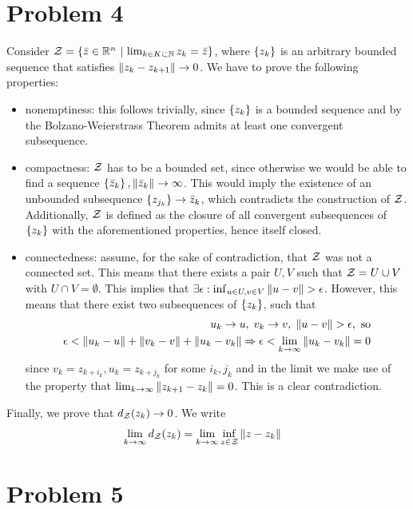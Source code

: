 \documentclass[10pt]{article}
\begin{document}
\section*{Problem 4}
Consider $\mathcal{Z} = \left\{ \bar{z} \in \mathbb{R}^n \ \middle| \  \lim_{k \in K \subset \mathbb{N}} z_{k}
= \bar{z} \right\}$, where $\left\{ z_k \right\}$ is an arbitrary bounded sequence that satisfies
$\left \| z_k - z_{k+1} \right \| \to 0$. We have to prove the following properties:
\begin{itemize}
\item nonemptiness: this follows trivially, since $\left\{ z_k \right\}$ is a bounded
sequence and by the Bolzano-Weierstrass Theorem admits at least one convergent
subsequence.
\item compactness: $\mathcal{Z}$ has to be a bounded set, since otherwise we would be
able to find a sequence $\left\{ \bar{z}_k \right\}, \left \| \bar{z}_k \right \| \to \infty$. This
would imply the existence of an unbounded subsequence $\left\{ z_{j_k} \right\} \to
\bar{z}_k$, which contradicts the construction of $\mathcal{Z}$.
Additionally, $\mathcal{Z}$ is defined as the closure of all convergent subsequences of
$\left\{ z_k \right\}$ with the aforementioned properties, hence itself closed.
\item connectedness: assume, for the sake of contradiction, that $\mathcal{Z}$ was not
a connected set. This means that there exists a pair $U, V$ such
that $\mathcal{Z} = U \cup V$ with $U \cap V = \emptyset$. This implies that
$\exists \epsilon: \inf_{u \in U, v \in V} \left \| u - v \right \| > \epsilon$. However,
this means that there exist two subsequences of $\left\{ z_k \right\}$, such that
\begin{align*}
    u_{k} \to u, \; v_{k} \to v, \; \left \| u - v \right \| > \epsilon, \text{ so} \\
    \epsilon < \left \| u_k - u \right \| + \left \| v_k - v \right \| + \left \| u_k - v_k \right \| \Rightarrow
    \epsilon < \lim_{k \to \infty} \left \| u_k - v_k \right \| = 0
\end{align*}
since $v_k = z_{k + i_k}, u_k = z_{k + j_k}$ for some $i_k, j_k$ and in the
limit we make use of the property that $\lim_{k \to \infty} \left \| z_{k+1} -
z_k \right \| = 0$. This is a clear contradiction.

\end{itemize}
Finally, we prove that $d_{\mathcal{Z}}(z_k) \to 0$. We write
\begin{align*}
    \lim_{k \to \infty} d_{\mathcal{Z}}(z_k) &=
        \lim_{k \to \infty} \inf_{z \in \mathcal{Z}} \left \| z - z_k \right \|
\end{align*}

\section*{Problem 5}
\end{document}

